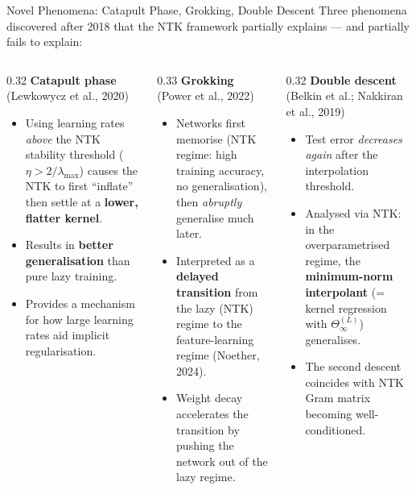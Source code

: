 \documentclass[aspectratio=169, 10pt]{beamer}
\newcommand{\NTK}{\Theta^{(L)}_\infty}
\newcommand{\highlight}[1]{\textcolor{blue!70!black}{\textbf{#1}}}
\begin{document}
\begin{frame}{Novel Phenomena: Catapult Phase, Grokking, Double Descent}
  Three phenomena discovered after 2018 that the NTK framework partially explains — and partially fails to explain:

  \vspace{0.3em}
  \begin{columns}[T]
    \begin{column}{0.32\textwidth}
      \textbf{Catapult phase} (Lewkowycz et al., 2020)
      \begin{itemize}
        \item Using learning rates \emph{above} the NTK stability threshold ($\eta > 2/\lambda_{\max}$) causes the NTK to first ``inflate'' then settle at a \highlight{lower, flatter kernel}.
        \item Results in \highlight{better generalisation} than pure lazy training.
        \item Provides a mechanism for how large learning rates aid implicit regularisation.
      \end{itemize}
    \end{column}
    \begin{column}{0.33\textwidth}
      \textbf{Grokking} (Power et al., 2022)
      \begin{itemize}
        \item Networks first memorise (NTK regime: high training accuracy, no generalisation), then \emph{abruptly} generalise much later.
        \item Interpreted as a \highlight{delayed transition} from the lazy (NTK) regime to the feature-learning regime (Noether, 2024).
        \item Weight decay accelerates the transition by pushing the network out of the lazy regime.
      \end{itemize}
    \end{column}
    \begin{column}{0.32\textwidth}
      \textbf{Double descent} (Belkin et al.; Nakkiran et al., 2019)
      \begin{itemize}
        \item Test error \emph{decreases again} after the interpolation threshold.
        \item Analysed via NTK: in the overparametrised regime, the \highlight{minimum-norm interpolant} (= kernel regression with $\NTK$) generalises.
        \item The second descent coincides with NTK Gram matrix becoming well-conditioned.
      \end{itemize}
    \end{column}
  \end{columns}
\end{frame}
\end{document}
